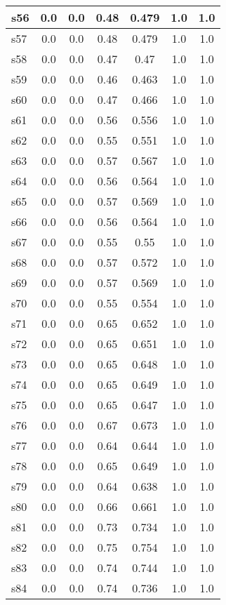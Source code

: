 \documentclass{article}
\begin{document}
\begin{tabular}{|l|c|c|c|c|c|c|}
\hline
s56 &0.0 & 0.0 & 0.48 & 0.479 & 1.0 & 1.0\\
\hline
s57 &0.0 & 0.0 & 0.48 & 0.479 & 1.0 & 1.0\\
\hline
s58 &0.0 & 0.0 & 0.47 & 0.47 & 1.0 & 1.0\\
\hline
s59 &0.0 & 0.0 & 0.46 & 0.463 & 1.0 & 1.0\\
\hline
s60 &0.0 & 0.0 & 0.47 & 0.466 & 1.0 & 1.0\\
\hline
s61 &0.0 & 0.0 & 0.56 & 0.556 & 1.0 & 1.0\\
\hline
s62 &0.0 & 0.0 & 0.55 & 0.551 & 1.0 & 1.0\\
\hline
s63 &0.0 & 0.0 & 0.57 & 0.567 & 1.0 & 1.0\\
\hline
s64 &0.0 & 0.0 & 0.56 & 0.564 & 1.0 & 1.0\\
\hline
s65 &0.0 & 0.0 & 0.57 & 0.569 & 1.0 & 1.0\\
\hline
s66 &0.0 & 0.0 & 0.56 & 0.564 & 1.0 & 1.0\\
\hline
s67 &0.0 & 0.0 & 0.55 & 0.55 & 1.0 & 1.0\\
\hline
s68 &0.0 & 0.0 & 0.57 & 0.572 & 1.0 & 1.0\\
\hline
s69 &0.0 & 0.0 & 0.57 & 0.569 & 1.0 & 1.0\\
\hline
s70 &0.0 & 0.0 & 0.55 & 0.554 & 1.0 & 1.0\\
\hline
s71 &0.0 & 0.0 & 0.65 & 0.652 & 1.0 & 1.0\\
\hline
s72 &0.0 & 0.0 & 0.65 & 0.651 & 1.0 & 1.0\\
\hline
s73 &0.0 & 0.0 & 0.65 & 0.648 & 1.0 & 1.0\\
\hline
s74 &0.0 & 0.0 & 0.65 & 0.649 & 1.0 & 1.0\\
\hline
s75 &0.0 & 0.0 & 0.65 & 0.647 & 1.0 & 1.0\\
\hline
s76 &0.0 & 0.0 & 0.67 & 0.673 & 1.0 & 1.0\\
\hline
s77 &0.0 & 0.0 & 0.64 & 0.644 & 1.0 & 1.0\\
\hline
s78 &0.0 & 0.0 & 0.65 & 0.649 & 1.0 & 1.0\\
\hline
s79 &0.0 & 0.0 & 0.64 & 0.638 & 1.0 & 1.0\\
\hline
s80 &0.0 & 0.0 & 0.66 & 0.661 & 1.0 & 1.0\\
\hline
s81 &0.0 & 0.0 & 0.73 & 0.734 & 1.0 & 1.0\\
\hline
s82 &0.0 & 0.0 & 0.75 & 0.754 & 1.0 & 1.0\\
\hline
s83 &0.0 & 0.0 & 0.74 & 0.744 & 1.0 & 1.0\\
\hline
s84 &0.0 & 0.0 & 0.74 & 0.736 & 1.0 & 1.0\\

\end{tabular}
\end{document}

